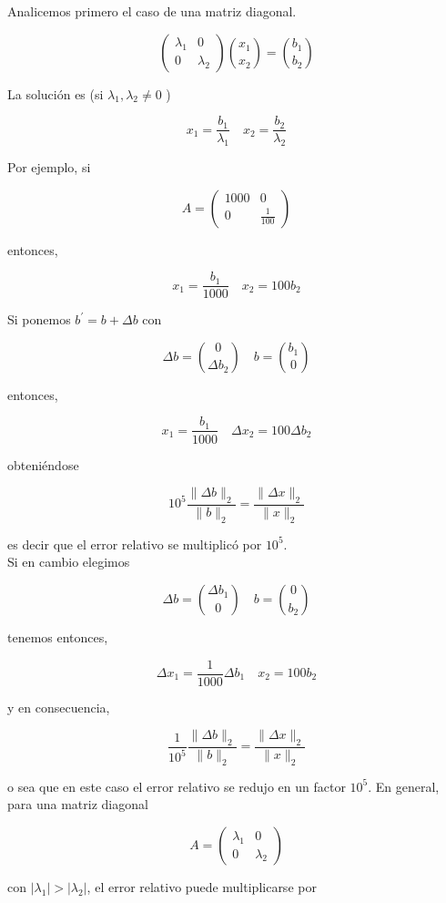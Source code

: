 \documentclass[10pt]{article}
\begin{document}
Analicemos primero el caso de una matriz diagonal.

$$
\left(\begin{array}{cc}
\lambda_{1} & 0 \\
0 & \lambda_{2}
\end{array}\right)\binom{x_{1}}{x_{2}}=\binom{b_{1}}{b_{2}}
$$

La solución es (si $\lambda_{1}, \lambda_{2} \neq 0$ )

$$
x_{1}=\frac{b_{1}}{\lambda_{1}} \quad x_{2}=\frac{b_{2}}{\lambda_{2}}
$$

Por ejemplo, si

$$
A=\left(\begin{array}{cc}
1000 & 0 \\
0 & \frac{1}{100}
\end{array}\right)
$$

entonces,

$$
x_{1}=\frac{b_{1}}{1000} \quad x_{2}=100 b_{2}
$$

Si ponemos $b^{\prime}=b+\Delta b$ con

$$
\Delta b=\binom{0}{\Delta b_{2}} \quad b=\binom{b_{1}}{0}
$$

entonces,

$$
x_{1}=\frac{b_{1}}{1000} \quad \Delta x_{2}=100 \Delta b_{2}
$$

obteniéndose

$$
10^{5} \frac{\|\Delta b\|_{2}}{\|b\|_{2}}=\frac{\|\Delta x\|_{2}}{\|x\|_{2}}
$$

es decir que el error relativo se multiplicó por $10^{5}$.\\
Si en cambio elegimos

$$
\Delta b=\binom{\Delta b_{1}}{0} \quad b=\binom{0}{b_{2}}
$$

tenemos entonces,

$$
\Delta x_{1}=\frac{1}{1000} \Delta b_{1} \quad x_{2}=100 b_{2}
$$

y en consecuencia,

$$
\frac{1}{10^{5}} \frac{\|\Delta b\|_{2}}{\|b\|_{2}}=\frac{\|\Delta x\|_{2}}{\|x\|_{2}}
$$

o sea que en este caso el error relativo se redujo en un factor $10^{5}$. En general, para una matriz diagonal

$$
A=\left(\begin{array}{cc}
\lambda_{1} & 0 \\
0 & \lambda_{2}
\end{array}\right)
$$

con $\left|\lambda_{1}\right|>\left|\lambda_{2}\right|$, el error relativo puede multiplicarse por
\end{document}
